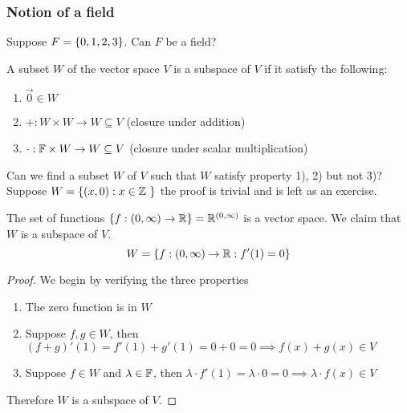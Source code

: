 \subsubsection*{Notion of a field}
Suppose $F  = \left\{ 0,1,2,3 \right\}$. Can $F$ be a field?
\begin{definition}
    A subset $W$ of the vector space $V$ is a subspace of $V$ if it satisfy the following:
    \begin{enumerate} [label  = \arabic*)]
        \item $\vec 0 \in W$ 
        \item $+ : W \times W \to W \subseteq V$ (closure under addition)
        \item $\cdot : \mathbb F \times W \to W \subseteq V$ (closure under scalar multiplication)
    \end{enumerate}
\end{definition}
\begin{example}
    Can we find a subset $W$ of $V$ such that $W$ satisfy property 1), 2) but not 3)? \\
    Suppose $W  =\lb (x,0) : x \in \b Z\ \rb$ the proof is trivial and is left as an exercise.
\end{example}
\begin{example}
    The set of functions $\left\{ f : (0 ,\infty) \to \mathbb R \right\} = \mathbb R^{(0,\infty)}$ is a vector space. We claim that $W$ is a subspace of $V$.
    \[ W = \left\{ f : (0,\infty) \to \mathbb R : f'(1) = 0 \right\}\]
\end{example}
\begin{proof}
    We begin by verifying the three properties
    \begin{enumerate} [label  = \arabic*)]
        \item The zero function is in $W$
        \item Suppose $f,g \in W$, then $(f + g)'(1) = f'(1) + g'(1) = 0 + 0 = 0 \implies f(x) + g(x) \in V$
        \item Suppose $f \in W$ and $\lambda \in \mathbb F$, then $\lambda \cdot f'(1) = \lambda \cdot 0 = 0 \implies \lambda \cdot f(x) \in V$
    \end{enumerate}
    Therefore $W$ is a subspace of $V$. 
\end{proof}
